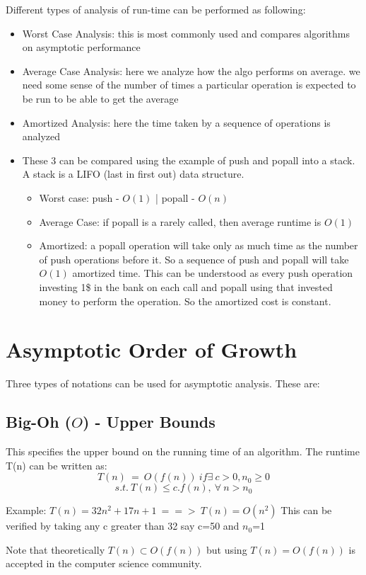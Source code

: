 Different types of analysis of run-time can be performed as following:
\begin{itemize}
    \item Worst Case Analysis: this is most commonly used and compares algorithms on asymptotic performance
    \item Average Case Analysis: here we analyze how the algo performs on average. we need some sense of the number of times a particular operation is expected to be run to be able to get the average
    \item Amortized Analysis: here the time taken by a sequence of operations is analyzed
    \item These 3 can be compared using the example of push and popall into a stack. A stack is a LIFO (last in first out) data structure.
    \begin{itemize}
        \item Worst case: push - $O(1)$ | popall - $O(n)$
        \item Average Case: if popall is a rarely called, then average runtime is $O(1)$
        \item Amortized: a popall operation will take only as much time as the number of push operations before it. So a sequence of push and popall will take $O(1)$ amortized time. This can be understood as every push operation investing 1\$ in the bank on each call and popall using that invested money to perform the operation. So the amortized cost is constant.
    \end{itemize}
\end{itemize}

\section{Asymptotic Order of Growth}

Three types of notations can be used for asymptotic analysis. These are:
\subsection{Big-Oh ($O$) - Upper Bounds}
This specifies the upper bound on the running time of an algorithm. The runtime T(n) can be written as:
$$ T(n)\ =\ O(f(n))\ if \exists\ c>0, n_0 \ge 0 $$
$$ s.t.\ T(n) \le c.f(n),\ \forall\ n>n_0 $$

Example: $T(n)=32n^2+17n+1\ ==>\ T(n)=O(n^2)$ This can be verified by taking any c greater than 32 say c=50 and $n_0$=1

Note that theoretically $T(n)\subset O(f(n))$ but using $T(n) = O(f(n))$ is accepted in the computer science community.

